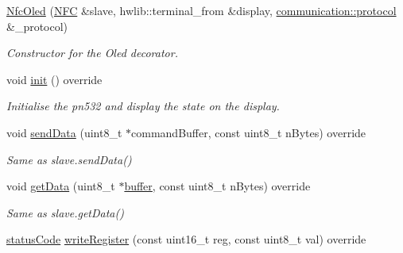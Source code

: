 \begin{DoxyCompactItemize}
\item 
\hyperlink{classnfc_1_1NfcOled_ab3917823345cbb6bc0881fa04d84a6cb}{Nfc\+Oled} (\hyperlink{classnfc_1_1NFC}{N\+FC} \&slave, hwlib\+::terminal\+\_\+from \&display, \hyperlink{classcommunication_1_1protocol}{communication\+::protocol} \&\+\_\+protocol)
\begin{DoxyCompactList}\small\item\em Constructor for the Oled decorator. \end{DoxyCompactList}\item 
\mbox{\label{classnfc_1_1NfcOled_a2b394a955afe3f280e3f2509908effe9}} 
void \hyperlink{classnfc_1_1NfcOled_a2b394a955afe3f280e3f2509908effe9}{init} () override
\begin{DoxyCompactList}\small\item\em Initialise the pn532 and display the state on the display. \end{DoxyCompactList}\item 
\mbox{\label{classnfc_1_1NfcOled_aa969ac754435a695ce1ddb8c4285e76c}} 
void \hyperlink{classnfc_1_1NfcOled_aa969ac754435a695ce1ddb8c4285e76c}{send\+Data} (uint8\+\_\+t $\ast$command\+Buffer, const uint8\+\_\+t n\+Bytes) override
\begin{DoxyCompactList}\small\item\em Same as slave.\+send\+Data() \end{DoxyCompactList}\item 
\mbox{\label{classnfc_1_1NfcOled_a4f9564fbbc2981031fbfbf50be308745}} 
void \hyperlink{classnfc_1_1NfcOled_a4f9564fbbc2981031fbfbf50be308745}{get\+Data} (uint8\+\_\+t $\ast$\hyperlink{classbuffer}{buffer}, const uint8\+\_\+t n\+Bytes) override
\begin{DoxyCompactList}\small\item\em Same as slave.\+get\+Data() \end{DoxyCompactList}\item 
\mbox{\label{classnfc_1_1NfcOled_a8782a26a35cb2b412621b580cc58eec4}} 
\hyperlink{declarations_8h_ae1d20c5a38cae82ccaa6a77be3fd264b}{status\+Code} \hyperlink{classnfc_1_1NfcOled_a8782a26a35cb2b412621b580cc58eec4}{write\+Register} (const uint16\+\_\+t reg, const uint8\+\_\+t val) override

\end{DoxyCompactItemize}
